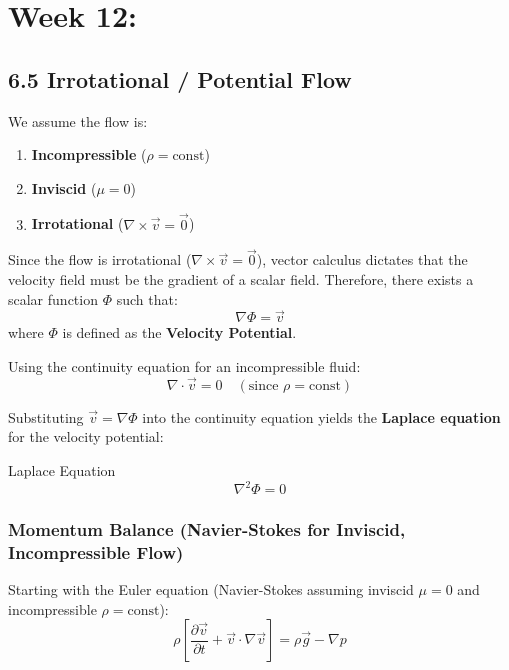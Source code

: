 \section{Week 12:}

\subsection{6.5 Irrotational / Potential Flow}

\begin{conceptbox}
We assume the flow is:
\begin{enumerate}
    \item \textbf{Incompressible} ($\rho = \text{const}$)
    \item \textbf{Inviscid} ($\mu = 0$)
    \item \textbf{Irrotational} ($\nabla \times \vec{v} = \vec{0}$)
\end{enumerate}
\end{conceptbox}

Since the flow is irrotational ($\nabla \times \vec{v} = \vec{0}$), vector calculus dictates that the velocity field must be the gradient of a scalar field. Therefore, there exists a scalar function $\Phi$ such that:
\begin{equation}
    \nabla \Phi = \vec{v}
\end{equation}
where $\Phi$ is defined as the \textbf{Velocity Potential}.

Using the continuity equation for an incompressible fluid:
\begin{equation}
    \nabla \cdot \vec{v} = 0 \quad (\text{since } \rho = \text{const})
\end{equation}

Substituting $\vec{v} = \nabla \Phi$ into the continuity equation yields the \textbf{Laplace equation} for the velocity potential:
\begin{eqbox}{Laplace Equation}
    \begin{equation}
        \nabla^2 \Phi = 0
    \end{equation}
\end{eqbox}

\subsubsection{Momentum Balance (Navier-Stokes for Inviscid, Incompressible Flow)}

Starting with the Euler equation (Navier-Stokes assuming inviscid $\mu=0$ and incompressible $\rho = \text{const}$):
\begin{equation}
    \rho \left[ \frac{\partial \vec{v}}{\partial t} + \vec{v} \cdot \nabla \vec{v} \right] = \rho \vec{g} - \nabla p
\end{equation}

